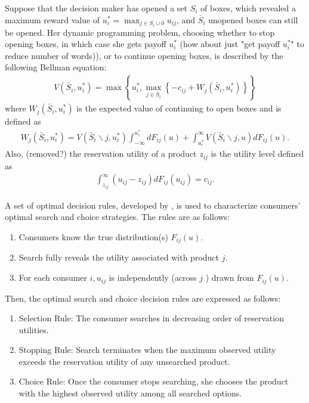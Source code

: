 \documentclass[12pt]{article}
\begin{document}
Suppose that the decision maker has opened a set \(S_{i}\) of boxes,
which revealed a maximum reward value of \(u_{i}^{*}=\max _{j \in S_{i} \cup 0} u_{i j}\), and \(\bar{S}_{i}\) unopened boxes can still be
opened. 
Her dynamic programming problem{\color{blue},} choosing {\color{blue}whether} to stop opening boxes{\color{blue}, in which case she
gets payoff \(u_{i}^{*}\) (how about just "get payoff \(u_{i}^{*}\)" to reduce number of words))}, or to continue opening boxes{\color{blue},} is described
by the following Bellman equation:
\begin{align}
    V\left(\bar{S}_{i}, u_{i}^{*}\right)=\max \left\{u_{i}^{*}, \max _{j \in \bar{S}_{i}}\left\{-c_{i j}+W_{j}\left(\bar{S}_{i}, u_{i}^{*}\right)\right\}\right\}\nonumber
\end{align}
where \(W_{j}\left(\bar{S}_{i}, u_{i}^{*}\right)\) is the expected value of continuing to open boxes and is
defined as
\begin{align}
    W_{j}\left(\bar{S}_{i}, u_{i}^{*}\right)=V\left(\bar{S}_{i} \backslash j, u_{i}^{*}\right) \int_{-\infty}^{u_{i}^{*}} d F_{i j}(u)+\int_{u_{i}^{*}}^{\infty} V\left(\bar{S}_{i} \backslash j, u\right) d F_{i j}(u).\nonumber
\end{align}
{\color{blue}Also, (removed?)} the reservation utility of a product \(z_{i j}\) is the utility level defined as 
\begin{align}
    \int_{z_{i j}}^{\infty}\left(u_{i j}-z_{i j}\right) d F_{i j}\left(u_{i j}\right)=c_{i j}.\nonumber
\end{align}

A set of optimal decision rules, developed by
\cite{weitzman1979optimal}, is used to characterize consumers' optimal search and choice strategies. 
The rules are as follows:
\begin{enumerate}
    \item Consumers know the true distribution(s) \(F_{i j}(u)\).
    \item Search fully reveals the utility associated with product \(j\).
    \item For each consumer \(i, u_{i j}\) is independently (across \(j\) ) drawn from \(F_{i j}(u)\).
\end{enumerate}
Then, the optimal search and choice decision
rules are expressed as follows:
\begin{enumerate}
    \item Selection Rule: The consumer searches in decreasing order of reservation utilities.
    \item Stopping Rule: Search terminates when the maximum observed utility exceeds the reservation utility of any unsearched product.
    \item Choice Rule: Once the consumer stops searching, she chooses the product with the highest observed utility among all searched options.
\end{enumerate}
\end{document}
